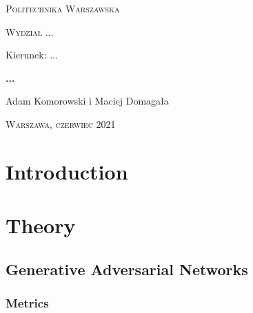 \documentclass[12pt,a4paper,openany]{book}
\begin{document}
\begin{titlepage}
\begin{flushleft}
\end{flushleft}
\begin{center}
\textsc{{\huge Politechnika Warszawska}}
\end{center}
\bigskip
\bigskip
\begin{center}
\textsc{{\Large Wydział ...}}
\end{center}
\bigskip
\bigskip
\begin{center}
\begin{Large}
Kierunek: ...
\end{Large}
\end{center}
\bigskip
\bigskip
\noindent\hrulefill
\begin{center}
\textsc{\textbf{{\large ...
\\}}}
\bigskip
\bigskip

{\large 
Adam Komorowski i Maciej Domagała}

\end{center}
\noindent\hrulefill
\bigskip
\bigskip
\begin{center}
\end{center}
\bigskip
\bigskip
\bigskip
\bigskip
\begin{center}
{\textsc{\large Warszawa, czerwiec 2021
}}
\end{center}
\end{titlepage}

\tableofcontents

\chapter*{Introduction}

\chapter{Theory}

\section{Generative Adversarial Networks}

%
%
%


\subsection{Metrics}
\end{document}
